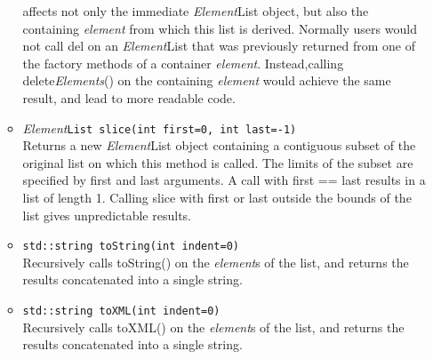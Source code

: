 \documentclass{revtex4}
\begin{document}
\begin{itemize}
\begin{itemize}
affects not only the immediate {\em Element}List object, but also the containing
{\em element} from which this list is derived.
Normally users would not call del on an {\em Element}List that was previously
returned from one of the factory methods of a container {\em element}.
Instead,calling delete{\em Elements}() on the containing {\em element} would
achieve the same result, and lead to more readable code.
\item {\em Element}\texttt{List slice(int first=0, int last=-1)}\\
Returns a new {\em Element}List object containing a contiguous subset of the
original list on which this method is called. The limits of the subset are
specified by first and last arguments. A call with first == last results in a
list of length 1. Calling slice with first or last outside the bounds of the
list gives unpredictable results.
\item \texttt{std::string toString(int indent=0)}\\
Recursively calls toString() on the {\em element}s of the list, and returns the
results concatenated into a single string.
\item \texttt{std::string toXML(int indent=0)}\\
Recursively calls toXML() on the {\em element}s of the list, and returns the
results concatenated into a single string.
\end{itemize}


\end{itemize}
\end{document}

